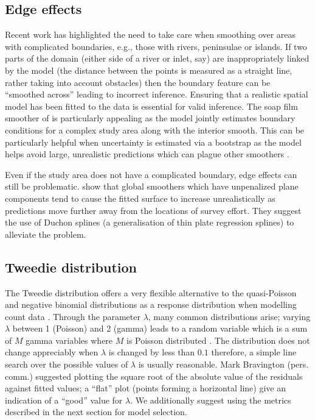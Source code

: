 \documentclass[a4paper,12pt]{article}
\begin{document}
\subsection*{Edge effects}
\label{s:leakage}

Recent work \citep{Ramsay:2002uo,Wang:2007tf,Wood:2008vo,ScottHayward:2011tc,Miller:2012tm} has highlighted the need to take care when smoothing over areas with complicated boundaries, e.g., those with rivers, peninsulae or islands. If two parts of the domain (either side of a river or inlet, say) are inappropriately linked by the model (the distance between the points is measured as a straight line, rather taking into account obstacles) then the boundary feature can be ``smoothed across'' leading to incorrect inference. Ensuring that a realistic spatial model has been fitted to the data is essential for valid inference. The soap film smoother of \cite{Wood:2008vo} is particularly appealing as the model jointly estimates boundary conditions for a complex study area along with the interior smooth. This can be particularly helpful when uncertainty is estimated via a bootstrap as the model helps avoid large, unrealistic predictions which can plague other smoothers \citep{Bravington:2009vo}.

Even if the study area does not have a complicated boundary, edge effects can still be problematic. \cite{Miller:wx} show that global smoothers which have unpenalized plane components tend to cause the fitted surface to increase unrealistically as predictions move further away from the locations of survey effort. They suggest the use of Duchon splines (a generalisation of thin plate regression splines) to alleviate the problem.

\subsection*{Tweedie distribution}
\label{s:Tweedie}

The Tweedie distribution offers a very flexible alternative to the quasi-Poisson and negative binomial distributions as a response distribution when modelling count data \citep{Candy:2004tb}. Through the parameter $\lambda$, many common distributions arise; varying $\lambda$ between 1 (Poisson) and 2 (gamma) leads to a random variable which is a sum of $M$ gamma variables where $M$ is Poisson distributed \citep{Jorgensen:1987vg}. The distribution does not change appreciably when $\lambda$ is changed by less than $0.1$ therefore, a simple line search over the possible values of $\lambda$ is usually reasonable. Mark Bravington (pers. comm.) suggested plotting the square root of the absolute value of the residuals against fitted values; a ``flat'' plot (points forming a horizontal line) give an indication of a ``good'' value for $\lambda$. We additionally suggest using the metrics described in the next section for model selection.
\end{document}
